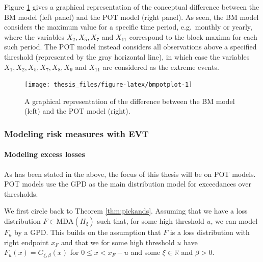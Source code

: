 \documentclass[a4paper,11pt]{article}
\theoremstyle{definition}
\theoremstyle{definition}
\theoremstyle{definition}
\theoremstyle{definition}
\theoremstyle{remark}
\begin{document}
Figure \ref{fig:bmpotplot} gives a graphical representation of the conceptual difference between the BM model (left panel) and the POT model (right panel). As seen, the BM model considers the maximum value for a specific time period, e.g.~monthly or yearly, where the variables \(X_2, X_5, X_7\) and \(X_{11}\) correspond to the block maxima for each such period. The POT model instead considers all observations above a specified threshold (represented by the gray horizontal line), in which case the variables \(X_1, X_2, X_5, X_7, X_8, X_9\) and \(X_{11}\) are considered as the extreme events.
\begin{figure}[H]

{\centering \texttt{[image: thesis\_files/figure-latex/bmpotplot-1]} 

}

\caption{A graphical representation of the difference between the BM model (left) and the POT model (right).}\label{fig:bmpotplot}
\end{figure}
\hypertarget{sec:modelingrisk}{%
\subsubsection{Modeling risk measures with EVT}\label{sec:modelingrisk}}

\hypertarget{modeling-excess-losses}{%
\paragraph{Modeling excess losses}\label{modeling-excess-losses}}

As has been stated in the above, the focus of this thesis will be on POT models. POT models use the GPD as the main distribution model for exceedances over thresholds.

We first circle back to Theorem \ref{thm:pickands}. Assuming that we have a loss distribution \(F \in \text{MDA}(H_\xi)\) such that, for some high threshold \(u\), we can model \(F_u\) by a GPD. This builds on the assumption that \(F\) is a loss distribution with right endpoint \(x_F\) and that we for some high threshold \(u\) have \(F_{u}(x)=G_{\xi, \beta}(x)\) for \(0 \leq x < x_F-u\) and some \(\xi \in \mathbb R\) and \(\beta > 0\).
\end{document}
